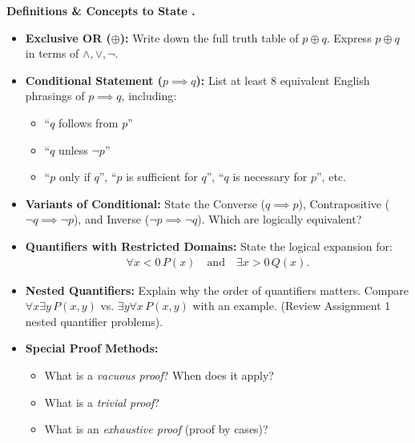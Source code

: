 \documentclass{natsirt}
\newcounter{topic}[section]
\newenvironment{recallbox}[1][]{%
    \begin{bluebox}[#1]\refstepcounter{topic}\textbf{Definitions \& Concepts to State \thesection.\thetopic}%
}{\end{bluebox}}
\newcommand{\citem}{\item[$\square$]}
\newcommand{\xor}{\oplus}
\begin{document}
\begin{recallbox}
    \begin{itemize}
        \citem \textbf{Exclusive OR ($\xor$):} Write down the full truth table of $p \xor q$. Express $p \xor q$ in terms of $\land, \lor, \neg$.
        \citem \textbf{Conditional Statement ($p \implies q$):} List at least 8 equivalent English phrasings of $p \implies q$, including:
        \begin{itemize}
            \item \textquotedblleft$q$ follows from $p$\textquotedblright
            \item \textquotedblleft$q$ unless $\neg p$\textquotedblright
            \item \textquotedblleft$p$ only if $q$\textquotedblright, \textquotedblleft$p$ is sufficient for $q$\textquotedblright, \textquotedblleft$q$ is necessary for $p$\textquotedblright, etc.
        \end{itemize}
        \citem \textbf{Variants of Conditional:} State the Converse ($q \implies p$), Contrapositive ($\neg q \implies \neg p$), and Inverse ($\neg p \implies \neg q$). Which are logically equivalent?
        \citem \textbf{Quantifiers with Restricted Domains:} State the logical expansion for:
        \begin{align*}
            \forall x < 0 \, P(x) \quad \text{and} \quad \exists x > 0 \, Q(x).
        \end{align*}
        \citem \textbf{Nested Quantifiers:} Explain why the order of quantifiers matters. Compare $\forall x \exists y \, P(x, y)$ vs. $\exists y \forall x \, P(x, y)$ with an example. (Review Assignment 1 nested quantifier problems).
        \citem \textbf{Special Proof Methods:}
        \begin{itemize}
            \item What is a \emph{vacuous proof}? When does it apply?
            \item What is a \emph{trivial proof}?
            \item What is an \emph{exhaustive proof} (proof by cases)?
        \end{itemize}
    \end{itemize}
\end{recallbox}
\end{document}
